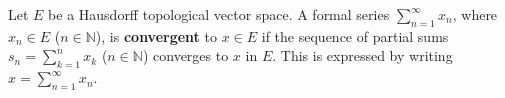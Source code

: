 Let $E$ be a Hausdorff topological vector space. A formal series $\sum_{n=1}^{\infty} x_n$, where $x_n \in E$ ($n \in \mathbb{N}$), is \textbf{convergent} to $x \in E$ if the sequence of partial sums $s_n = \sum_{k=1}^{n} x_k$ ($n \in \mathbb{N}$) converges to $x$ in $E$. This is expressed by writing $x = \sum_{n=1}^{\infty} x_n$.
